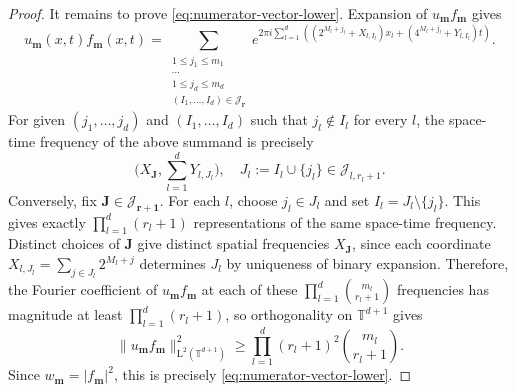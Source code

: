 \documentclass[11pt,reqno]{amsart}
\numberwithin{equation}{section}
\renewcommand{\leq}{\leqslant}
\renewcommand{\ge}{\geqslant}
\begin{document}
\begin{proof}
It remains to prove \eqref{eq:numerator-vector-lower}. Expansion of $u_{\mathbf{m}}f_{\mathbf{m}}$ gives
\[ u_{\mathbf{m}}(x,t) f_{\mathbf{m}}(x,t)
= \sum_{\substack{1\leq j_1\leq m_1\\ \cdots\\ 1\leq j_d\leq m_d\\ (I_1,\ldots,I_d)\in\mathcal{J}_{\mathbf{r}}}} 
e^{2\pi i\sum_{l=1}^d\left((2^{M_l+j_l}+X_{l,I_l})x_l+(4^{M_l+j_l}+Y_{l,I_l})t\right)}. \]
For given $(j_1,\ldots,j_d)$ and $(I_1,\ldots,I_d)$ such that $j_l\not\in I_l$ for every $l$, the space-time frequency of the above summand is precisely
\[ \biggl(X_{\mathbf{J}},\sum_{l=1}^dY_{l,J_l}\biggr), \quad J_l:=I_l\cup\{j_l\}\in\mathcal{J}_{l,r_l+1}. \]
Conversely, fix $\mathbf{J}\in\mathcal{J}_{\mathbf{r}+\mathbf{1}}$. For each $l$, choose $j_l\in J_l$ and set $I_l=J_l\setminus\{j_l\}$. This gives exactly $\prod_{l=1}^d (r_l+1)$ representations of the same space-time frequency. Distinct choices of $\mathbf{J}$ give distinct spatial frequencies $X_{\mathbf{J}}$, since each coordinate $X_{l,J_l}=\sum_{j\in J_l}2^{M_l+j}$ determines $J_l$ by uniqueness of binary expansion. Therefore, the Fourier coefficient of $u_{\mathbf{m}}f_{\mathbf{m}}$ at each of these $\prod_{l=1}^d \binom{m_l}{r_l+1}$ frequencies has magnitude at least $\prod_{l=1}^d(r_l+1)$, so orthogonality on $\mathbb{T}^{d+1}$ gives
\[ \|u_{\mathbf{m}}f_{\mathbf{m}}\|_{\mathrm{L}^2(\mathbb{T}^{d+1})}^2 \ge \prod_{l=1}^d (r_l+1)^2\binom{m_l}{r_l+1}. \]
Since $w_{\mathbf{m}}=|f_{\mathbf{m}}|^2$, this is precisely \eqref{eq:numerator-vector-lower}.
\end{proof}
\end{document}
